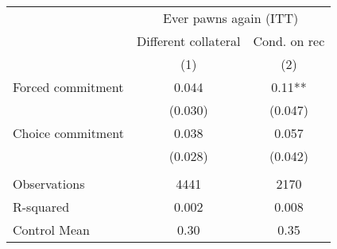 \begin{tabular}{lcc}
\toprule
      & \multicolumn{2}{c}{Ever pawns again (ITT)} \\
\cmidrule{2-3}      & Different collateral & Cond. on rec \\
\midrule
\midrule
      & (1)   & (2) \\
\midrule
\midrule
Forced commitment & 0.044 & 0.11** \\
      & (0.030) & (0.047) \\
Choice commitment & 0.038 & 0.057 \\
      & (0.028) & (0.042) \\
      &       &  \\
\midrule
Observations & 4441  & 2170 \\
R-squared & 0.002 & 0.008 \\
Control Mean & 0.30  & 0.35 \\
\bottomrule
\bottomrule
\end{tabular}%
